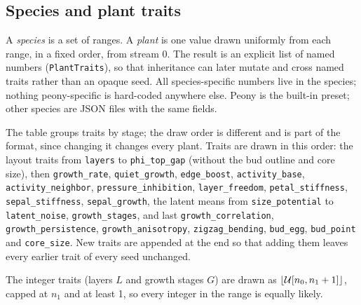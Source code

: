\subsection{Species and plant traits}\label{sec:traits}
A \emph{species} is a set of ranges. A \emph{plant} is one value drawn
uniformly from each range, in a fixed order, from stream 0. The result is an
explicit list of named numbers (\texttt{PlantTraits}), so that inheritance can
later mutate and cross named traits rather than an opaque seed. All
species-specific numbers live in the species; nothing peony-specific is
hard-coded anywhere else. Peony is the built-in preset; other species are JSON
files with the same fields.

\begin{sloppypar}
The table groups traits by stage; the draw order is different and is part
of the format, since changing it changes every plant. Traits are drawn in this
order: the layout traits from \texttt{layers} to \texttt{phi\_top\_gap}
(without the bud outline and core size), then \texttt{growth\_rate},
\texttt{quiet\_growth}, \texttt{edge\_boost}, \texttt{activity\_base},
\texttt{activity\_neighbor}, \texttt{pressure\_inhibition},
\texttt{layer\_freedom}, \texttt{petal\_stiffness},
\texttt{sepal\_stiffness}, \texttt{sepal\_growth}, the latent means from
\texttt{size\_potential} to \texttt{latent\_noise}, \texttt{growth\_stages},
and last \texttt{growth\_correlation}, \texttt{growth\_persistence},
\texttt{growth\_anisotropy}, \texttt{zigzag\_bending}, \texttt{bud\_egg},
\texttt{bud\_point} and \texttt{core\_size}. New traits are appended at the
end so that adding them leaves every earlier trait of every seed unchanged.
\end{sloppypar}

The integer traits (layers $L$ and growth stages $G$) are drawn as
$\lfloor\mathcal{U}[n_0, n_1+1]\rfloor$, capped at $n_1$ and at least 1, so every
integer in the range is equally likely.

